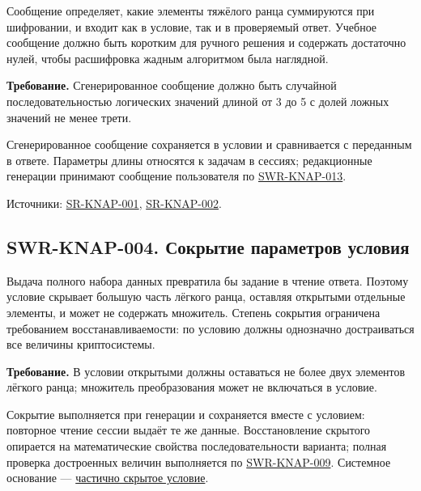 \documentclass[12pt,a4paper]{article}
\begin{document}
\hypertarget{swr-knap-003-генерация-сообщения}{}

\hypertarget{swr-knap-003}{}

Сообщение определяет, какие элементы тяжёлого ранца суммируются при шифровании, и входит как в условие, так и в проверяемый ответ. Учебное сообщение должно быть коротким для ручного решения и содержать достаточно нулей, чтобы расшифровка жадным алгоритмом была наглядной.

\textbf{Требование.} Сгенерированное сообщение должно быть случайной последовательностью логических значений длиной от 3 до 5 с долей ложных значений не менее трети.

Сгенерированное сообщение сохраняется в условии и сравнивается с переданным в ответе. Параметры длины относятся к задачам в сессиях; редакционные генерации принимают сообщение пользователя по {\hyperlink{swr-knap-013}{SWR-KNAP-013}}.

Источники: {\href{../04\_Системные\_требования/DOC-05\_Системные\_требования.pdf\#sr-knap-001}{SR-KNAP-001}}, {\href{../04\_Системные\_требования/DOC-05\_Системные\_требования.pdf\#sr-knap-002}{SR-KNAP-002}}.

\subsection{SWR-KNAP-004. Сокрытие параметров условия}\label{swr-knap-004-ux441ux43eux43aux440ux44bux442ux438ux435-ux43fux430ux440ux430ux43cux435ux442ux440ux43eux432-ux443ux441ux43bux43eux432ux438ux44f}

\hypertarget{swr-knap-004-сокрытие-параметров-условия}{}

\hypertarget{swr-knap-004}{}

Выдача полного набора данных превратила бы задание в чтение ответа. Поэтому условие скрывает большую часть лёгкого ранца, оставляя открытыми отдельные элементы, и может не содержать множитель. Степень сокрытия ограничена требованием восстанавливаемости: по условию должны однозначно достраиваться все величины криптосистемы.

\textbf{Требование.} В условии открытыми должны оставаться не более двух элементов лёгкого ранца; множитель преобразования может не включаться в условие.

Сокрытие выполняется при генерации и сохраняется вместе с условием: повторное чтение сессии выдаёт те же данные. Восстановление скрытого опирается на математические свойства последовательности варианта; полная проверка достроенных величин выполняется по {\hyperlink{swr-knap-009}{SWR-KNAP-009}}. Системное основание --- {\href{../04\_Системные\_требования/DOC-05\_Системные\_требования.pdf\#sr-knap-002-частично-скрытое-условие}{частично скрытое условие}}.
\end{document}
